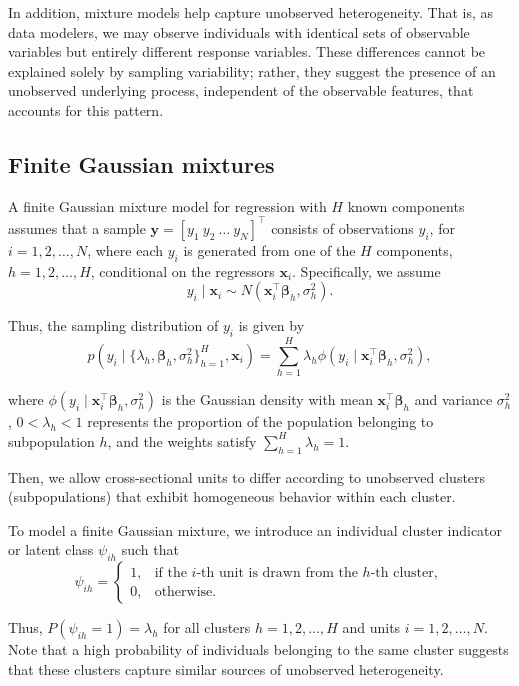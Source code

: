 In addition, mixture models help capture unobserved heterogeneity. That is, as data modelers, we may observe individuals with identical sets of observable variables but entirely different response variables. These differences cannot be explained solely by sampling variability; rather, they suggest the presence of an unobserved underlying process, independent of the observable features, that accounts for this pattern.

\subsection{Finite Gaussian mixtures}\label{sec11_11}
A finite Gaussian mixture model for regression with \( H \) known components assumes that a sample 
\( \boldsymbol{y}=\left[y_1 \ y_2 \ \dots \ y_N\right]^{\top} \) consists of observations \( y_i \), 
for \( i=1,2,\dots,N \), where each \( y_i \) is generated from one of the \( H \) components, 
\( h=1,2,\dots,H \), conditional on the regressors \( \boldsymbol{x}_i \). Specifically, we assume  
\[
y_i \mid \boldsymbol{x}_i \sim N(\boldsymbol{x}_i^{\top}\boldsymbol{\beta}_h, \sigma_h^2).
\]

Thus, the sampling distribution of \( y_i \) is given by  
\[
p(y_i \mid \{\lambda_h, \boldsymbol{\beta}_h, \sigma_h^2\}_{h=1}^H, \boldsymbol{x}_i) = 
\sum_{h=1}^H \lambda_h \phi(y_i \mid \boldsymbol{x}_i^{\top}\boldsymbol{\beta}_h, \sigma_h^2),
\]

where \( \phi(y_i \mid \boldsymbol{x}_i^{\top}\boldsymbol{\beta}_h, \sigma_h^2) \) is the Gaussian density with mean 
\( \boldsymbol{x}_i^{\top}\boldsymbol{\beta}_h \) and variance \( \sigma_h^2 \), \( 0 < \lambda_h < 1 \) represents 
the proportion of the population belonging to subpopulation \( h \), and the weights satisfy 
\( \sum_{h=1}^H \lambda_h = 1 \).

Then, we allow cross-sectional units to differ according to unobserved clusters (subpopulations) that exhibit homogeneous behavior within each cluster.

To model a finite Gaussian mixture, we introduce an individual cluster indicator or latent class \( \psi_{ih} \) such that  
\[
\psi_{ih}=
\begin{cases}
	1, & \text{if the } i\text{-th unit is drawn from the } h\text{-th cluster}, \\
	0, & \text{otherwise}.
\end{cases}
\]

Thus, \( P(\psi_{ih}=1) = \lambda_h \) for all clusters \( h=1,2,\dots,H \) and units \( i=1,2,\dots,N \). Note that a high probability of individuals belonging to the same cluster suggests that these clusters capture similar sources of unobserved heterogeneity.


